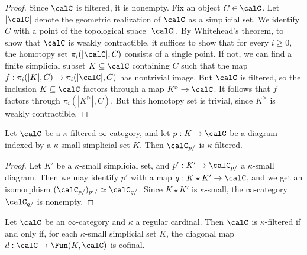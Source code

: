 \begin{proof}
Since $\calC$ is filtered, it is nonempty. Fix an object $C \in \calC$. Let $| \calC | $ denote the geometric realization of $\calC$ as a simplicial set. We identify $C$ with a point of the topological space $| \calC |$. By Whitehead's theorem, to show that $\calC$ is weakly contractible, it suffices to show that for every $i \geq 0$, the homotopy set $\pi_{i}( |\calC|, C)$ consists of a single point.
If not, we can find a finite simplicial subset $K \subseteq \calC$ containing $C$ such that the map $f: \pi_{i}( |K|, C) \rightarrow \pi_{i}( | \calC|,C)$ has nontrivial image. But $\calC$ is filtered, so the inclusion $K \subseteq \calC$ factors through a map $K^{\triangleright} \rightarrow \calC$.
It follows that $f$ factors through $\pi_{i}( |K^{\triangleright}|, C)$. But this homotopy set is trivial, since $K^{\triangleright}$ is weakly contractible.
\end{proof}

\begin{lemma}\label{forfilt}
Let $\calC$ be a $\kappa$-filtered $\infty$-category, and let $p: K \rightarrow \calC$
be a diagram indexed by a $\kappa$-small simplicial set $K$. Then $\calC_{p/}$ is $\kappa$-filtered.
\end{lemma}

\begin{proof}
Let $K'$ be a $\kappa$-small simplicial set, and $p': K' \rightarrow \calC_{p/}$ a $\kappa$-small diagram. Then we may identify $p'$ with a map $q: K \star K' \rightarrow \calC$, and we get an isomorphism $( \calC_{p/} )_{p'/} \simeq \calC_{q/}$. Since $K \star K'$ is $\kappa$-small,
the $\infty$-category $\calC_{q/}$ is nonempty.
\end{proof}

\begin{proposition}\label{undertruck}
Let $\calC$ be an $\infty$-category and $\kappa$ a regular cardinal. Then $\calC$ is $\kappa$-filtered if and only if, for each $\kappa$-small simplicial set $K$, the diagonal map
$d: \calC \rightarrow \Fun(K,\calC)$ is cofinal.
\end{proposition}

